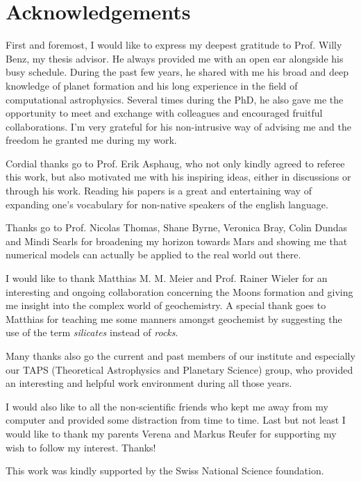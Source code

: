 \cleardoublepage
\chapter*{Acknowledgements}

First and foremost, I would like to express my deepest gratitude to Prof. Willy Benz, my thesis advisor. He always provided me with an open ear alongside his busy schedule. During the past few years, he shared with me his broad and deep knowledge of planet formation and his long experience in the field of computational astrophysics. Several times during the PhD, he also gave me the opportunity to meet and exchange with colleagues and encouraged fruitful collaborations. I'm very grateful for his non-intrusive way of advising me and the freedom he granted me during my work.

Cordial thanks go to Prof. Erik Asphaug, who not only kindly agreed to referee this work, but also motivated me with his inspiring ideas, either in discussions or through his work. Reading his papers is a great and entertaining way of expanding one's vocabulary for non-native speakers of the english language.

Thanks go to Prof. Nicolas Thomas, Shane Byrne, Veronica Bray, Colin Dundas and Mindi Searls for broadening my horizon towards Mars and showing me that numerical models can actually be applied to the real world out there.

I would like to thank Matthias M. M. Meier and Prof. Rainer Wieler for an interesting and ongoing collaboration concerning the Moons formation and giving me insight into the complex world of geochemistry. A special thank goes to Matthias for teaching me some manners amongst geochemist by suggesting the use of the term \emph{silicates} instead of \emph{rocks}.

Many thanks also go the current and past members of our institute and especially our TAPS (Theoretical Astrophysics and Planetary Science) group, who provided an interesting and helpful work environment during all those years.

I would also like to all the non-scientific friends who kept me away from my computer and provided some distraction from time to time. Last but not least I would like to thank my parents Verena and Markus Reufer for supporting my wish to follow my interest. Thanks!

This work was kindly supported by the Swiss National Science foundation.
